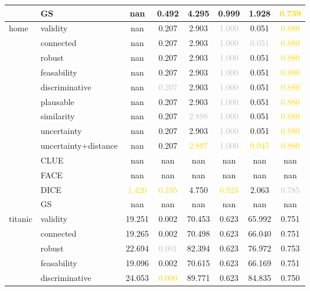 \begin{table}[ht]
\begin{tabular}{l l c c c c c c}
 & GS & nan & 0.492 & 4.295 & 0.999 & 1.928 & \textcolor{gold}{0.739} \\
\hline
\multirow{13}{*}{home} & validity & nan & 0.207 & 2.903 & \textcolor{silver}{1.000} & \textcolor{bronze}{0.051} & \textcolor{gold}{0.880} \\
 & connected & nan & 0.207 & \textcolor{bronze}{2.903} & \textcolor{silver}{1.000} & \textcolor{silver}{0.051} & \textcolor{gold}{0.880} \\
 & robust & nan & 0.207 & 2.903 & \textcolor{silver}{1.000} & 0.051 & \textcolor{gold}{0.880} \\
 & feasability & nan & 0.207 & 2.903 & \textcolor{silver}{1.000} & 0.051 & \textcolor{gold}{0.880} \\
 & discriminative & nan & \textcolor{silver}{0.207} & 2.903 & \textcolor{silver}{1.000} & 0.051 & \textcolor{gold}{0.880} \\
 & plausable & nan & \textcolor{bronze}{0.207} & 2.903 & \textcolor{silver}{1.000} & 0.051 & \textcolor{gold}{0.880} \\
 & similarity & nan & 0.207 & \textcolor{silver}{2.898} & \textcolor{silver}{1.000} & 0.051 & \textcolor{gold}{0.880} \\
 & uncertainty & nan & 0.207 & 2.903 & \textcolor{silver}{1.000} & 0.051 & \textcolor{gold}{0.880} \\
 & uncertainty+distance & nan & 0.207 & \textcolor{gold}{2.897} & \textcolor{silver}{1.000} & \textcolor{gold}{0.045} & \textcolor{gold}{0.880} \\
 & CLUE & nan & nan & nan & nan & nan & nan \\
 & FACE & nan & nan & nan & nan & nan & nan \\
 & DICE & \textcolor{gold}{1.420} & \textcolor{gold}{0.195} & 4.750 & \textcolor{gold}{0.923} & 2.063 & \textcolor{silver}{0.785} \\
 & GS & nan & nan & nan & nan & nan & nan \\
\hline
\multirow{13}{*}{titanic} & validity & 19.251 & 0.002 & 70.453 & 0.623 & 65.992 & 0.751 \\
 & connected & 19.265 & 0.002 & 70.498 & 0.623 & 66.040 & 0.751 \\
 & robust & 22.694 & \textcolor{silver}{0.001} & 82.394 & 0.623 & 76.972 & \textcolor{bronze}{0.753} \\
 & feasability & 19.096 & 0.002 & 70.615 & 0.623 & 66.169 & 0.751 \\
 & discriminative & 24.053 & \textcolor{gold}{0.000} & 89.771 & 0.623 & 84.835 & 0.750 \\

\end{tabular}
\end{table}
